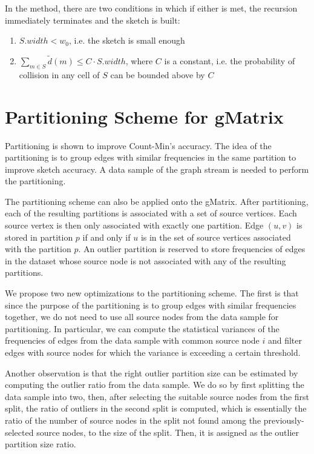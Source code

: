 In the method, there are two conditions in which if either is met, the recursion immediately terminates and the sketch is built:

\begin{enumerate}
\item $S.width < w_0$, i.e. the sketch is small enough
\item $\sum_{m\in S}\tilde{d}(m) \leq C \cdot S.width$, where $C$ is a constant, i.e. the probability of collision in any cell of $S$ can be bounded above by $C$
\end{enumerate}


\section{Partitioning Scheme for gMatrix}

Partitioning\cite{DBLP} is shown to improve Count-Min's\cite{DBLP}\cite{cormode2005improved} accuracy. The idea of the partitioning is to group edges with similar frequencies in the same partition to improve sketch accuracy. A data sample of the graph stream is needed to perform the partitioning.

The partitioning scheme can also be applied onto the gMatrix. After partitioning, each of the resulting partitions is associated with a set of source vertices. Each source vertex is then only associated with exactly one partition. Edge $(u,v)$ is stored in partition $p$ if and only if $u$ is in the set of source vertices associated with the partition $p$. An outlier partition is reserved to store frequencies of edges in the dataset whose source node is not associated with any of the resulting partitions.

We propose two new optimizations to the partitioning scheme. The first is that since the purpose of the partitioning is to group edges with similar frequencies together, we do not need to use all source nodes from the data sample for partitioning. In particular, we can compute the statistical variances of the frequencies of edges from the data sample with common source node $i$ and filter edges with source nodes for which the variance is exceeding a certain threshold.

Another observation is that the right outlier partition size can be estimated by computing the outlier ratio from the data sample. We do so by first splitting the data sample into two, then, after selecting the suitable source nodes from the first split, the ratio of outliers in the second split is computed, which is essentially the ratio of the number of source nodes in the split not found among the previously-selected source nodes, to the size of the split. Then, it is assigned as the outlier partition size ratio.


